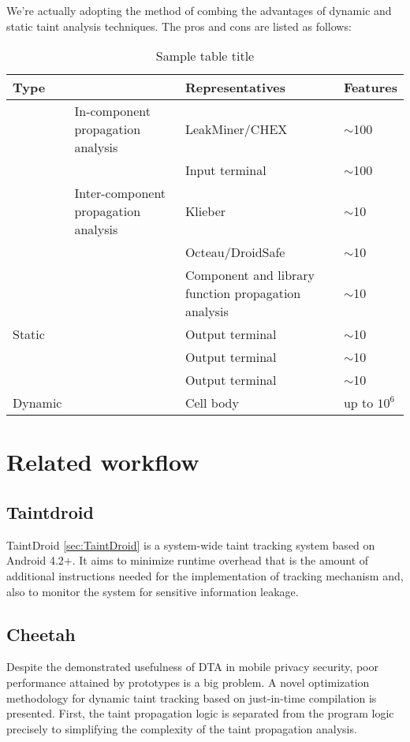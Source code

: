 \documentclass{article}
\begin{document}
We're actually adopting the method of combing the advantages of dynamic and static taint analysis techniques. The pros and cons are listed as follows:

\begin{table}
  \caption{Sample table title}
   \centering
   \begin{tabular}{llll}
     \toprule
     Type     & &Representatives     & Features \\
     \midrule
           & In-component propagation analysis &LeakMiner/CHEX  & $\sim$100     \\
           &  &Input terminal  & $\sim$100     \\
           & Inter-component propagation analysis &Klieber  & $\sim$10      \\
           &  &Octeau/DroidSafe & $\sim$10      \\
           & & Component and library function propagation analysis & $\sim$10      \\
     Static & & Output terminal & $\sim$10      \\
           & & Output terminal & $\sim$10      \\
           & & Output terminal & $\sim$10      \\
     Dynamic &   & Cell body       & up to $10^6$  \\
     \bottomrule
   \end{tabular}
   \label{tab:table}
 \end{table}


\section{Related workflow}

\subsection{Taintdroid}
TaintDroid \ref{sec:TaintDroid} is a system-wide taint tracking system based on Android 4.2+. It aims to minimize runtime overhead that is the amount of additional instructions needed for the implementation of tracking mechanism and, also to monitor the system for sensitive information leakage.

\subsection{Cheetah}
Despite the demonstrated usefulness of DTA in mobile privacy security, poor performance attained by prototypes is a big problem. A novel optimization methodology for dynamic taint tracking based on just-in-time compilation is presented. First, the taint propagation logic is separated from the program logic precisely to simplifying the complexity of the taint propagation analysis. 
\end{document}
